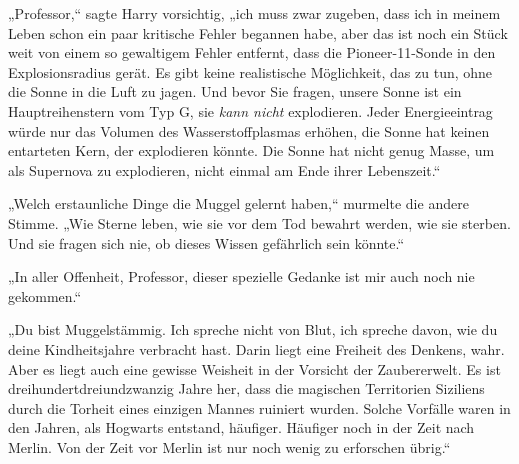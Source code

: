 „Professor,“ sagte Harry vorsichtig, „ich muss zwar zugeben, dass ich in meinem Leben schon ein paar kritische Fehler begannen habe, aber das ist noch ein Stück weit von einem so gewaltigem Fehler entfernt, dass die Pioneer-11-Sonde in den Explosionsradius gerät. Es gibt keine realistische Möglichkeit, das zu tun, ohne die Sonne in die Luft zu jagen. Und bevor Sie fragen, unsere Sonne ist ein Hauptreihenstern vom Typ G, sie \emph{kann nicht} explodieren. Jeder Energieeintrag würde nur das Volumen des Wasserstoffplasmas erhöhen, die Sonne hat keinen entarteten Kern, der explodieren könnte. Die Sonne hat nicht genug Masse, um als Supernova zu explodieren, nicht einmal am Ende ihrer Lebenszeit.“

„Welch erstaunliche Dinge die Muggel gelernt haben,“ murmelte die andere Stimme. „Wie Sterne leben, wie sie vor dem Tod bewahrt werden, wie sie sterben. Und sie fragen sich nie, ob dieses Wissen gefährlich sein könnte.“

„In aller Offenheit, Professor, dieser spezielle Gedanke ist mir auch noch nie gekommen.“

„Du bist Muggelstämmig. Ich spreche nicht von Blut, ich spreche davon, wie du deine Kindheitsjahre verbracht hast. Darin liegt eine Freiheit des Denkens, wahr. Aber es liegt auch eine gewisse Weisheit in der Vorsicht der Zaubererwelt. Es ist dreihundertdreiundzwanzig Jahre her, dass die magischen Territorien Siziliens durch die Torheit eines einzigen Mannes ruiniert wurden. Solche Vorfälle waren in den Jahren, als Hogwarts entstand, häufiger. Häufiger noch in der Zeit nach Merlin. Von der Zeit vor Merlin ist nur noch wenig zu erforschen übrig.“

